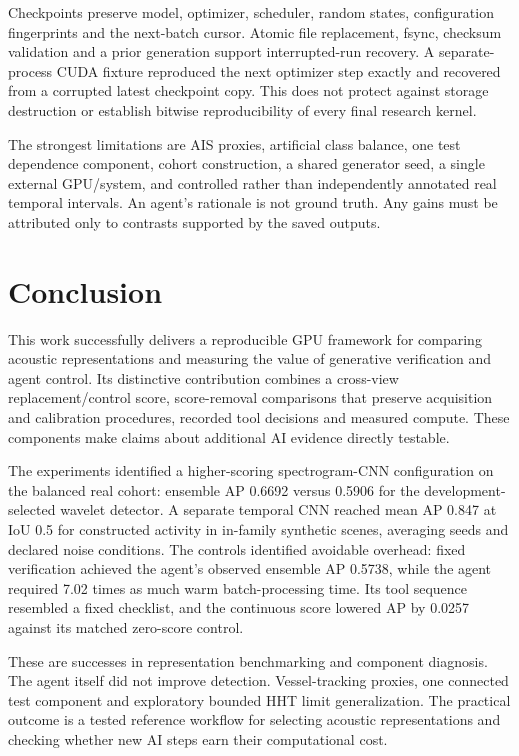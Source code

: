 \documentclass[11pt,letterpaper]{article}
\begin{document}
Checkpoints preserve model, optimizer, scheduler, random states, configuration fingerprints and the next-batch cursor. Atomic file replacement, fsync, checksum validation and a prior generation support interrupted-run recovery. A separate-process CUDA fixture reproduced the next optimizer step exactly and recovered from a corrupted latest checkpoint copy. This does not protect against storage destruction or establish bitwise reproducibility of every final research kernel.\par

The strongest limitations are AIS proxies, artificial class balance, one test dependence component, cohort construction, a shared generator seed, a single external GPU/system, and controlled rather than independently annotated real temporal intervals. An agent's rationale is not ground truth. Any gains must be attributed only to contrasts supported by the saved outputs.\par

\clearpage

\section{Conclusion}

This work successfully delivers a reproducible GPU framework for comparing acoustic representations and measuring the value of generative verification and agent control. Its distinctive contribution combines a cross-view replacement/control score, score-removal comparisons that preserve acquisition and calibration procedures, recorded tool decisions and measured compute. These components make claims about additional AI evidence directly testable.\par

The experiments identified a higher-scoring spectrogram-CNN configuration on the balanced real cohort: ensemble AP 0.6692 versus 0.5906 for the development-selected wavelet detector. A separate temporal CNN reached mean AP 0.847 at IoU 0.5 for constructed activity in in-family synthetic scenes, averaging seeds and declared noise conditions. The controls identified avoidable overhead: fixed verification achieved the agent's observed ensemble AP 0.5738, while the agent required 7.02 times as much warm batch-processing time. Its tool sequence resembled a fixed checklist, and the continuous score lowered AP by 0.0257 against its matched zero-score control.\par

These are successes in representation benchmarking and component diagnosis. The agent itself did not improve detection. Vessel-tracking proxies, one connected test component and exploratory bounded HHT limit generalization. The practical outcome is a tested reference workflow for selecting acoustic representations and checking whether new AI steps earn their computational cost.\par

{\fontsize{9}{11}\selectfont





}
\end{document}
